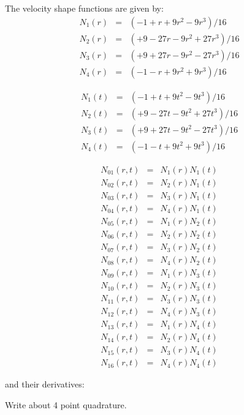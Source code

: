 The velocity shape functions are given by:
\begin{eqnarray}
N_1(r)&=&(-1   +r +9r^2 - 9r^3)/16 \nonumber\\
N_2(r)&=&(+9 -27r -9r^2 +27r^3)/16 \nonumber\\
N_3(r)&=&(+9 +27r -9r^2 -27r^3)/16 \nonumber\\
N_4(r)&=&(-1   -r +9r^2 + 9r^3)/16 \nonumber
\end{eqnarray}

\begin{eqnarray}
N_1(t)&=&(-1   +t +9t^2 - 9t^3)/16 \nonumber\\
N_2(t)&=&(+9 -27t -9t^2 +27t^3)/16 \nonumber\\
N_3(t)&=&(+9 +27t -9t^2 -27t^3)/16 \nonumber\\
N_4(t)&=&(-1   -t +9t^2 + 9t^3)/16 \nonumber
\end{eqnarray}

\begin{eqnarray}
N_01(r,t)&=&N_1(r)N_1(t) \\
N_02(r,t)&=&N_2(r)N_1(t) \\
N_03(r,t)&=&N_3(r)N_1(t) \\
N_04(r,t)&=&N_4(r)N_1(t) \\
N_05(r,t)&=&N_1(r)N_2(t) \\
N_06(r,t)&=&N_2(r)N_2(t) \\
N_07(r,t)&=&N_3(r)N_2(t) \\
N_08(r,t)&=&N_4(r)N_2(t) \\
N_09(r,t)&=&N_1(r)N_3(t) \\
N_10(r,t)&=&N_2(r)N_3(t) \\
N_11(r,t)&=&N_3(r)N_3(t) \\
N_12(r,t)&=&N_4(r)N_3(t) \\
N_13(r,t)&=&N_1(r)N_4(t) \\
N_14(r,t)&=&N_2(r)N_4(t) \\
N_15(r,t)&=&N_3(r)N_4(t) \\
N_16(r,t)&=&N_4(r)N_4(t) 
\end{eqnarray}

and their derivatives:






{\color{red} Write about 4 point quadrature}.









